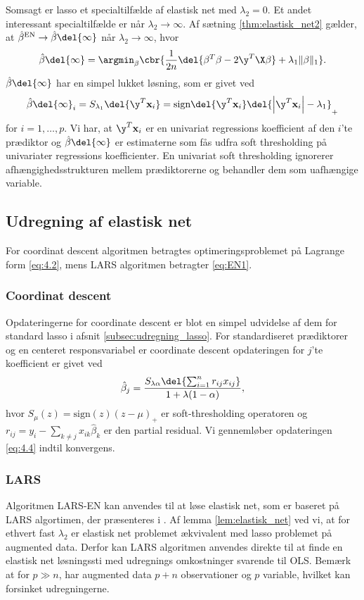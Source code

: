 Somsagt er lasso et specialtilfælde af elastisk net med \(\lambda_2=0\). 
Et andet interessant specialtilfælde er når \(\lambda_2 \rightarrow \infty\).
Af sætning \ref{thm:elastisk_net2} gælder, at \(\hat{\beta}^\text{EN} \rightarrow \hat{\beta} \del{\infty}\) når \(\lambda_2 \rightarrow \infty\), hvor
\begin{align*}
\hat{\beta} \del{\infty} = \argmin_\beta \cbr{\frac{1}{2n} \del{\beta^T \beta - 2 \y^T \X \beta} + \lambda_1 \Vert \beta \Vert_1}.
\end{align*}
\(\hat{\beta} \del{\infty}\) har en simpel lukket løsning, som er givet ved
\begin{align*}
\hat{\beta} \del{\infty}_i = S_{\lambda_1} \del{\y^T \mathbf{x}_i}=\text{sign} \del{\y^T \mathbf{x}_i} \del{\left\vert \y^T \mathbf{x}_i \right\vert - \lambda_1}_+
\end{align*}
for \(i = 1, \ldots, p\).
Vi har, at \(\y^T \mathbf{x}_i\) er en univariat regressions koefficient af den \(i\)'te prædiktor og \(\hat{\beta} \del{\infty}\) er estimaterne som fås udfra soft thresholding på univariater regressions koefficienter.
En univariat soft thresholding ignorerer afhængighedsstrukturen mellem prædiktorerne og behandler dem som uafhængige variable.
%
\subsection{Udregning af elastisk net}
For coordinat descent algoritmen betragtes optimeringsproblemet på Lagrange form \eqref{eq:4.2}, mens LARS algoritmen betragter \eqref{eq:EN1}.
%
\subsubsection{Coordinat descent}
Opdateringerne for coordinate descent er blot en simpel udvidelse af dem for standard lasso i afsnit \ref{subsec:udregning_lasso}.
For standardiseret prædiktorer og en centeret responsvariabel er coordinate descent opdateringen for $j$'te koefficient er givet ved
\begin{align}
\hat{\beta}_j = \frac{S_{\lambda \alpha} \del{\sum_{i=1}^n r_{ij} x_{ij}}}{1 + \lambda (1-\alpha)}, \label{eq:4.4}
\end{align}
hvor $S_\mu(z)=\text{sign}(z)(z-\mu)_+$ er soft-thresholding operatoren og $r_{ij}=y_i - \sum_{k \neq j} x_{ik} \hat{\beta}_k$ er den partial residual. 
Vi gennemløber opdateringen \eqref{eq:4.4} indtil konvergens.
%
\subsubsection{LARS}
Algoritmen LARS-EN kan anvendes til at løse elastisk net, som er baseret på LARS algortimen, der præsenteres i \cite{efron}.
Af lemma \ref{lem:elastisk_net} ved vi, at for ethvert fast \(\lambda_2\) er elastisk net problemet ækvivalent med lasso problemet på augmented data.
Derfor kan LARS algoritmen anvendes direkte til at finde en elastisk net løsningssti med udregnings omkostninger svarende til OLS.
Bemærk at for \(p \gg n\), har augmented data \(p+n\) observationer og \(p\) variable, hvilket kan forsinket udregningerne.

